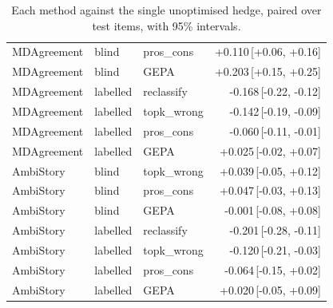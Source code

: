 \begin{table}[t]
\begin{tabular}{lllr}
MDAgreement & blind & pros\_cons & +0.110{\scriptsize\,[+0.06, +0.16]} \\
MDAgreement & blind & GEPA & +0.203{\scriptsize\,[+0.15, +0.25]} \\
MDAgreement & labelled & reclassify & -0.168{\scriptsize\,[-0.22, -0.12]} \\
MDAgreement & labelled & topk\_wrong & -0.142{\scriptsize\,[-0.19, -0.09]} \\
MDAgreement & labelled & pros\_cons & -0.060{\scriptsize\,[-0.11, -0.01]} \\
MDAgreement & labelled & GEPA & +0.025{\scriptsize\,[-0.02, +0.07]} \\
AmbiStory & blind & topk\_wrong & +0.039{\scriptsize\,[-0.05, +0.12]} \\
AmbiStory & blind & pros\_cons & +0.047{\scriptsize\,[-0.03, +0.13]} \\
AmbiStory & blind & GEPA & -0.001{\scriptsize\,[-0.08, +0.08]} \\
AmbiStory & labelled & reclassify & -0.201{\scriptsize\,[-0.28, -0.11]} \\
AmbiStory & labelled & topk\_wrong & -0.120{\scriptsize\,[-0.21, -0.03]} \\
AmbiStory & labelled & pros\_cons & -0.064{\scriptsize\,[-0.15, +0.02]} \\
AmbiStory & labelled & GEPA & +0.020{\scriptsize\,[-0.05, +0.09]} \\
\hline
\end{tabular}
\caption{Each method against the single unoptimised hedge, paired over test items, with 95\% intervals.}
\label{tab:paired-methods}
\end{table}